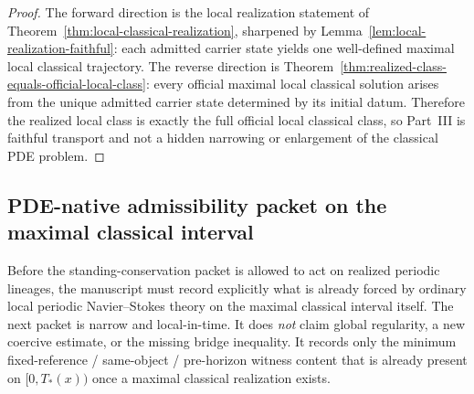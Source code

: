 \begin{proof}
The forward direction is the local realization statement of Theorem~\ref{thm:local-classical-realization}, sharpened by Lemma~\ref{lem:local-realization-faithful}: each admitted carrier state yields one well-defined maximal local classical trajectory. The reverse direction is Theorem~\ref{thm:realized-class-equals-official-local-class}: every official maximal local classical solution arises from the unique admitted carrier state determined by its initial datum. Therefore the realized local class is exactly the full official local classical class, so Part~III is faithful transport and not a hidden narrowing or enlargement of the classical PDE problem.
\end{proof}

\subsection{PDE-native admissibility packet on the maximal classical interval}
\label{subsec:pde-native-admissibility-packet}
Before the standing-conservation packet is allowed to act on realized periodic lineages, the manuscript must record explicitly what is already forced by ordinary local periodic Navier--Stokes theory on the maximal classical interval itself. The next packet is narrow and local-in-time. It does \emph{not} claim global regularity, a new coercive estimate, or the missing bridge inequality. It records only the minimum fixed-reference / same-object / pre-horizon witness content that is already present on $[0,T_*(x))$ once a maximal classical realization exists.

